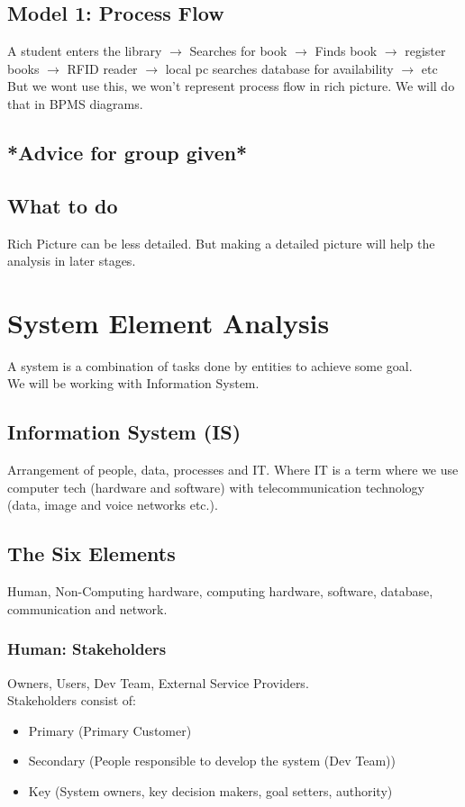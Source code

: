 \documentclass{article}
\begin{document}
        \subsection*{Model 1: Process Flow}
            A student enters the library \(\rightarrow\) Searches for book \(\rightarrow\) Finds book \(\to\) register books \(\to\) RFID reader \(\to\) local pc searches database for availability \(\to\) etc
            \\
            But we wont use this, we won't represent process flow in rich picture. We will do that in BPMS diagrams.
        \subsection*{*Advice for group given*}
        \subsection*{What to do}
            Rich Picture can be less detailed. But making a detailed picture will help the analysis in later stages.
    \section*{System Element Analysis}
        A system is a combination of tasks done by entities to achieve some goal.\\
        We will be working with Information System.
        \subsection*{Information System (IS)}
            Arrangement of people, data, processes and IT. Where IT is a term where we use computer tech (hardware and software) with telecommunication technology (data, image and voice networks etc.).
        \subsection*{The Six Elements}
            Human, Non-Computing hardware, computing hardware, software, database, communication and network.
            \subsubsection*{Human: Stakeholders}
                Owners, Users, Dev Team, External Service Providers.\\
                Stakeholders consist of:
                \begin{itemize}
                    \item Primary (Primary Customer)
                    \item Secondary (People responsible to develop the system (Dev Team))
                    \item Key (System owners, key decision makers, goal setters, authority)
                \end{itemize}
\end{document}
